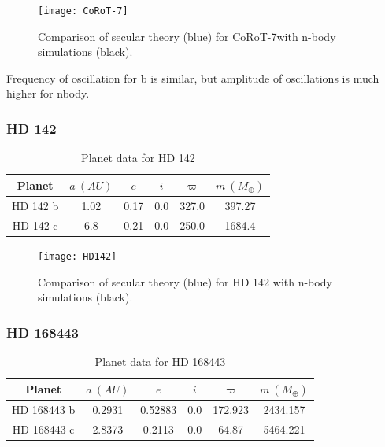 \documentclass[11pt, oneside]{article}   	%
\begin{document}
\begin{figure}[!h]
\begin{center}
\texttt{[image: CoRoT-7]}
\caption[]{Comparison of secular theory (blue) for CoRoT-7with n-body simulations (black).}
\label{}
\end{center}
\end{figure}

Frequency of oscillation for b is similar, but amplitude of oscillations is much higher for nbody.

\newpage

\subsubsection{HD 142}

\begin{table}[!h]
\centering
\small
\label{my-label}
\begin{tabular}{|c|c|c|c|c|c|}
\hline
\rowcolor[HTML]{C0C0C0} 
Planet & $a \ (AU)$       & $e$     & $i$   & $\varpi$  & $m \ (M _{\oplus})$ \\ \hline
HD 142 b    & 1.02 & 0.17 & 0.0 & 327.0 & 397.27 \\ \hline
HD 142 c    & 6.8  & 0.21 & 0.0 & 250.0 & 1684.4 \\ \hline
\end{tabular}
\caption{Planet data for HD 142}
\end{table}

\begin{figure}[!h]
\begin{center}
\texttt{[image: HD142]}
\caption[]{Comparison of secular theory (blue) for HD 142 with n-body simulations (black).}
\label{}
\end{center}
\end{figure}

\newpage

\subsubsection{HD 168443}

\begin{table}[!h]
\centering
\small
\label{my-label}
\begin{tabular}{|c|c|c|c|c|c|}
\hline
\rowcolor[HTML]{C0C0C0} 
Planet & $a \ (AU)$       & $e$     & $i$   & $\varpi$  & $m \ (M _{\oplus})$ \\ \hline
HD 168443 b    & 0.2931 & 0.52883 & 0.0 & 172.923 & 2434.157 \\ \hline
HD 168443 c    & 2.8373 & 0.2113  & 0.0 & 64.87   & 5464.221 \\ \hline
\end{tabular}
\caption{Planet data for HD 168443}
\end{table}
\end{document}
